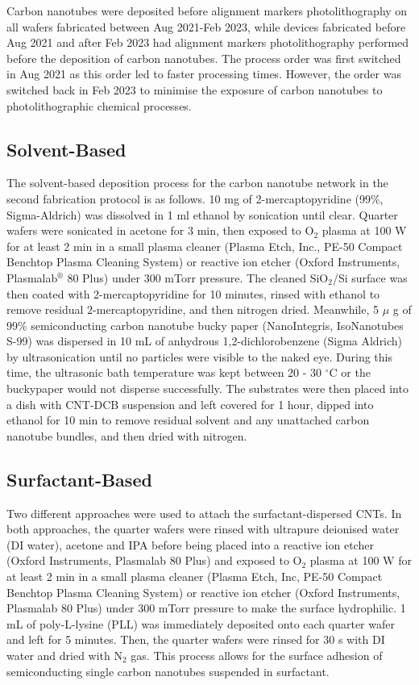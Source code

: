 \documentclass[
  a4paper,
]{scrbook}
\begin{document}
Carbon nanotubes were deposited before alignment markers
photolithography on all wafers fabricated between Aug 2021-Feb 2023,
while devices fabricated before Aug 2021 and after Feb 2023 had
alignment markers photolithography performed before the deposition of
carbon nanotubes. The process order was first switched in Aug 2021 as
this order led to faster processing times. However, the order was
switched back in Feb 2023 to minimise the exposure of carbon nanotubes
to photolithographic chemical processes.

\hypertarget{solvent-based}{%
\subsection{Solvent-Based}\label{solvent-based}}

The solvent-based deposition process for the carbon nanotube network in
the second fabrication protocol is as follows. 10 mg of
2-mercaptopyridine (99\%, Sigma-Aldrich) was dissolved in 1 ml ethanol
by sonication until clear. Quarter wafers were sonicated in acetone for
3 min, then exposed to O\(_2\) plasma at 100 W for at least 2 min in a
small plasma cleaner (Plasma Etch, Inc., PE-50 Compact Benchtop Plasma
Cleaning System) or reactive ion etcher (Oxford Instruments,
Plasmalab\(^\circledR\) 80 Plus) under 300 mTorr pressure. The cleaned
SiO\(_2\)/Si surface was then coated with 2-mercaptopyridine for 10
minutes, rinsed with ethanol to remove residual \(2\)-mercaptopyridine,
and then nitrogen dried. Meanwhile, 5 \(\mu\) g of 99\% semiconducting
carbon nanotube bucky paper (NanoIntegris, IsoNanotubes S-99) was
dispersed in 10 mL of anhydrous 1,2-dichlorobenzene (Sigma Aldrich) by
ultrasonication until no particles were visible to the naked eye. During
this time, the ultrasonic bath temperature was kept between 20 - 30
\(^\circ\)C or the buckypaper would not disperse successfully. The
substrates were then placed into a dish with CNT-DCB suspension and left
covered for 1 hour, dipped into ethanol for 10 min to remove residual
solvent and any unattached carbon nanotube bundles, and then dried with
nitrogen.

\hypertarget{surfactant-based}{%
\subsection{Surfactant-Based}\label{surfactant-based}}

Two different approaches were used to attach the surfactant-dispersed
CNTs. In both approaches, the quarter wafers were rinsed with ultrapure
deionised water (DI water), acetone and IPA before being placed into a
reactive ion etcher (Oxford Instruments, Plasmalab 80 Plus) and exposed
to O\(_2\) plasma at 100 W for at least 2 min in a small plasma cleaner
(Plasma Etch, Inc, PE-50 Compact Benchtop Plasma Cleaning System) or
reactive ion etcher (Oxford Instruments, Plasmalab 80 Plus) under 300
mTorr pressure to make the surface hydrophilic. 1 mL of poly-L-lysine
(PLL) was immediately deposited onto each quarter wafer and left for 5
minutes. Then, the quarter wafers were rinsed for 30 s with DI water and
dried with N\(_2\) gas. This process allows for the surface adhesion of
semiconducting single carbon nanotubes suspended in surfactant.
\end{document}

